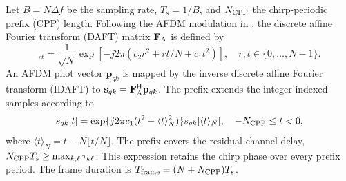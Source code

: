 \documentclass[10pt,a4paper]{article}
\begin{document}
Let $B=N\Delta f$ be the sampling rate, $T_s=1/B$, and $N_{\rm CPP}$ the
chirp-periodic prefix (CPP) length. Following the AFDM modulation in
\cite[Secs.~II-B and III-A]{bemani2022}, the discrete affine Fourier
transform (DAFT) matrix $\mathbf{F}_{\rm A}$ is defined by
\begin{equation}
 [\mathbf{F}_{\rm A}]_{rt}=\frac{1}{\sqrt N}
 \exp[-j2\pi(c_2r^2+rt/N+c_1t^2)],
 \quad r,t\in\{0,\ldots,N-1\}.
 \label{eq:daft}
\end{equation}
An AFDM pilot vector $\mathbf{p}_{qk}$ is mapped by the inverse discrete
affine Fourier transform (IDAFT) to
$\mathbf{s}_{qk}=\mathbf{F}_{\rm A}^{\mathsf H}\mathbf{p}_{qk}$. The
prefix extends the integer-indexed samples according to
\begin{equation}
 s_{qk}[t]=\exp\{j2\pi c_1(t^2-\langle t\rangle_N^2)\}
              s_{qk}[\langle t\rangle_N],
 \quad -N_{\rm CPP}\leq t<0,
 \label{eq:cpp}
\end{equation}
where $\langle t\rangle_N=t-N\lfloor t/N\rfloor$. The prefix covers the
residual channel delay, $N_{\rm CPP}T_s\geq\max_{k,\ell}\tau_{k\ell}$.
This expression retains the chirp phase over every prefix period. The frame duration is
$T_{\rm frame}=(N+N_{\rm CPP})T_s$.
\end{document}
